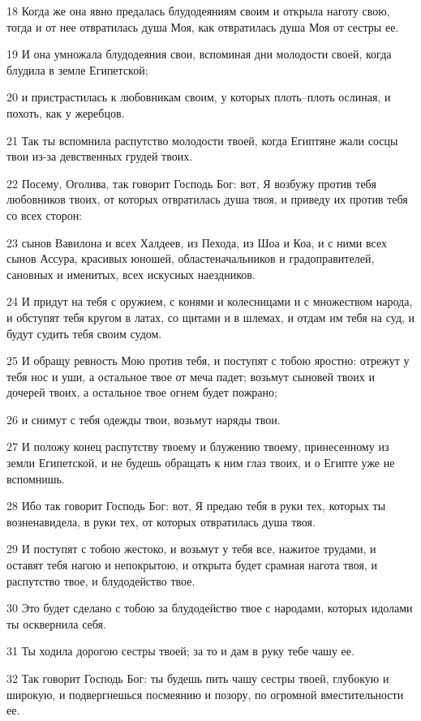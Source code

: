 \par 18 Когда же она явно предалась блудодеяниям своим и открыла наготу свою, тогда и от нее отвратилась душа Моя, как отвратилась душа Моя от сестры ее.
\par 19 И она умножала блудодеяния свои, вспоминая дни молодости своей, когда блудила в земле Египетской;
\par 20 и пристрастилась к любовникам своим, у которых плоть--плоть ослиная, и похоть, как у жеребцов.
\par 21 Так ты вспомнила распутство молодости твоей, когда Египтяне жали сосцы твои из-за девственных грудей твоих.
\par 22 Посему, Оголива, так говорит Господь Бог: вот, Я возбужу против тебя любовников твоих, от которых отвратилась душа твоя, и приведу их против тебя со всех сторон:
\par 23 сынов Вавилона и всех Халдеев, из Пехода, из Шоа и Коа, и с ними всех сынов Ассура, красивых юношей, областеначальников и градоправителей, сановных и именитых, всех искусных наездников.
\par 24 И придут на тебя с оружием, с конями и колесницами и с множеством народа, и обступят тебя кругом в латах, со щитами и в шлемах, и отдам им тебя на суд, и будут судить тебя своим судом.
\par 25 И обращу ревность Мою против тебя, и поступят с тобою яростно: отрежут у тебя нос и уши, а остальное твое от меча падет; возьмут сыновей твоих и дочерей твоих, а остальное твое огнем будет пожрано;
\par 26 и снимут с тебя одежды твои, возьмут наряды твои.
\par 27 И положу конец распутству твоему и блужению твоему, принесенному из земли Египетской, и не будешь обращать к ним глаз твоих, и о Египте уже не вспомнишь.
\par 28 Ибо так говорит Господь Бог: вот, Я предаю тебя в руки тех, которых ты возненавидела, в руки тех, от которых отвратилась душа твоя.
\par 29 И поступят с тобою жестоко, и возьмут у тебя все, нажитое трудами, и оставят тебя нагою и непокрытою, и открыта будет срамная нагота твоя, и распутство твое, и блудодейство твое.
\par 30 Это будет сделано с тобою за блудодейство твое с народами, которых идолами ты осквернила себя.
\par 31 Ты ходила дорогою сестры твоей; за то и дам в руку тебе чашу ее.
\par 32 Так говорит Господь Бог: ты будешь пить чашу сестры твоей, глубокую и широкую, и подвергнешься посмеянию и позору, по огромной вместительности ее.

